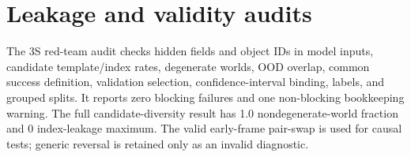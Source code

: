 \section{Leakage and validity audits}
The 3S red-team audit checks hidden fields and object IDs in model inputs, candidate template/index rates, degenerate worlds, OOD overlap, common success definition, validation selection, confidence-interval binding, labels, and grouped splits. It reports zero blocking failures and one non-blocking bookkeeping warning. The full candidate-diversity result has 1.0 nondegenerate-world fraction and 0 index-leakage maximum. The valid early-frame pair-swap is used for causal tests; generic reversal is retained only as an invalid diagnostic.
